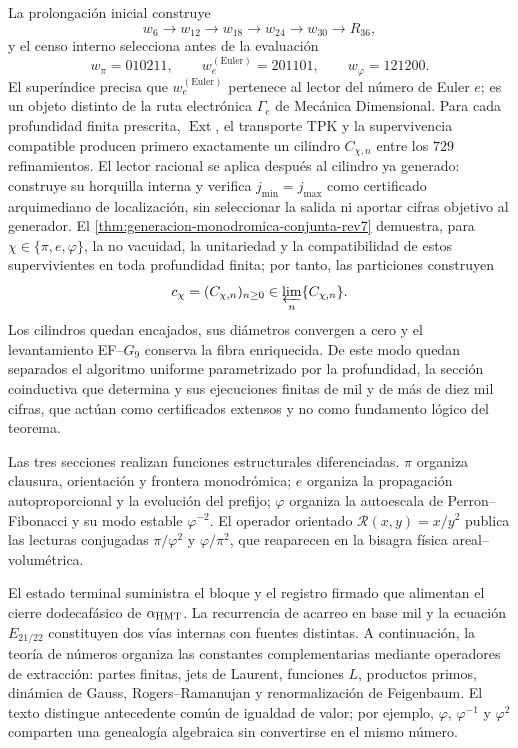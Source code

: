 La prolongación inicial construye
\[
 w_6\longrightarrow w_{12}\longrightarrow w_{18}
 \longrightarrow w_{24}\longrightarrow w_{30}
 \longrightarrow R_{36},
\]
y el censo interno selecciona antes de la evaluación
\[
 w_\pi=010211,\qquad w_e^{(\mathrm{Euler})}=201101,\qquad
 w_\varphi=121200.
\]
El superíndice precisa que \(w_e^{(\mathrm{Euler})}\) pertenece al lector del
número de Euler \(e\); es un objeto distinto de la ruta electrónica
\(\Gamma_e\) de Mecánica Dimensional.
Para cada profundidad finita prescrita, \(\operatorname{Ext}\), el
transporte TPK y la supervivencia compatible producen primero exactamente un
cilindro \(C_{\chi,n}\) entre los \(729\) refinamientos. El lector racional
se aplica después al cilindro ya generado: construye su horquilla interna y
verifica \(j_{\min}=j_{\max}\) como certificado arquimediano de localización,
sin seleccionar la salida ni aportar cifras objetivo al generador. El
\cref{thm:generacion-monodromica-conjunta-rev7} demuestra, para
\(\chi\in\{\pi,e,\varphi\}\), la no vacuidad, la unitariedad y la
compatibilidad de estos supervivientes en toda profundidad finita; por tanto,
las particiones construyen
\[
 c_\chi=(C_{\chi,n})_{n\ge0}
 \in\varprojlim_n\{C_{\chi,n}\}.
\]
Los cilindros quedan encajados, sus diámetros convergen a cero y el
levantamiento EF--\(G_9\) conserva la fibra enriquecida. De este modo quedan
separados el algoritmo uniforme parametrizado por la profundidad, la sección
coinductiva que determina y sus ejecuciones finitas de mil y de más de diez
mil cifras, que actúan como certificados extensos y no como fundamento
lógico del teorema.

Las tres secciones realizan funciones estructurales diferenciadas. \(\pi\)
organiza clausura, orientación y frontera monodrómica; \(e\) organiza la
propagación autoproporcional y la evolución del prefijo; \(\varphi\) organiza
la autoescala de Perron--Fibonacci y su modo estable \(\varphi^{-2}\). El
operador orientado \(\mathscr R(x,y)=x/y^2\) publica las lecturas conjugadas
\(\pi/\varphi^2\) y \(\varphi/\pi^2\), que reaparecen en la bisagra física
areal--volumétrica.

El estado terminal suministra el bloque y el registro firmado que alimentan
el cierre dodecafásico de \(\alpha_{\rm HMT}\). La recurrencia de acarreo en
base mil y la ecuación \(E_{21/22}\) constituyen dos vías internas con
fuentes distintas. A continuación, la teoría de números organiza las
constantes complementarias mediante operadores de extracción: partes finitas,
jets de Laurent, funciones \(L\), productos primos, dinámica de Gauss,
Rogers--Ramanujan y renormalización de Feigenbaum. El texto distingue
antecedente común de igualdad de valor; por ejemplo, \(\varphi\),
\(\varphi^{-1}\) y \(\varphi^2\) comparten una genealogía algebraica sin
convertirse en el mismo número.

